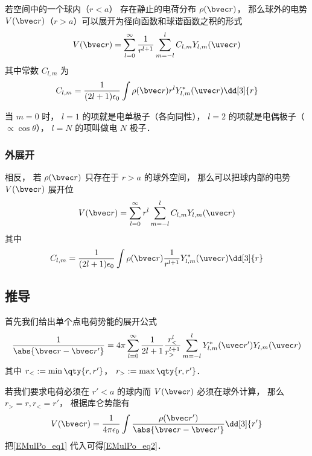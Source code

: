 

若空间中的一个球内（$r < a$） 存在静止的电荷分布 $\rho(\bvec r)$， 那么球外的电势 $V(\bvec r)$（$r > a$）可以展开为径向函数和球谐函数之积的形式
\begin{equation}\label{EMulPo_eq2}
V(\bvec r) = \sum_{l = 0}^\infty \frac{1}{r^{l+1}}\sum_{m = -l}^l C_{l,m} Y_{l,m}(\uvec r)
\end{equation}
其中常数 $C_{l,m}$ 为
\begin{equation}
C_{l,m} = \frac{1}{(2l+1)\epsilon_0} \int \rho(\bvec r) r^l Y_{l,m}^*(\uvec r) \dd[3]{r}
\end{equation}

当 $m = 0$ 时， $l = 1$ 的项就是电单极子（各向同性）， $l = 2$ 的项就是电偶极子（$\propto\cos \theta$）， $l = N$ 的项叫做电 $N$ 极子．

\subsubsection{外展开}
相反， 若 $\rho(\bvec r)$ 只存在于 $r > a$ 的球外空间， 那么可以把球内部的电势 $V(\bvec r)$ 展开位
\begin{equation}
V(\bvec r) = \sum_{l = 0}^\infty r^l \sum_{m = -l}^l C_{l,m} Y_{l,m}(\uvec r)
\end{equation}
其中
\begin{equation}
C_{l,m} = \frac{1}{(2l+1)\epsilon_0} \int \rho(\bvec r) \frac{1}{r^{l+1}} Y_{l,m}^*(\uvec r) \dd[3]{r}
\end{equation}



\subsection{推导}
首先我们给出单个点电荷势能的展开公式
\begin{equation}\label{EMulPo_eq1}
\frac{1}{\abs{\bvec r - \bvec r'}} = 4\pi \sum_{l=0}^{\infty} \frac{1}{2l+1} \frac{r_<^l}{r_>^{l+1}} \sum_{m = -l}^l Y_{l,m}^*(\uvec r') Y_{l,m}(\uvec r)
\end{equation}
其中 $r_< := \min\qty{r, r'}$， $r_> := \max\qty{r, r'}$．

若我们要求电荷必须在 $r' < a$ 的球内而 $V(\bvec r)$ 必须在球外计算， 那么 $r_> = r, r_< = r'$， 根据库仑势能有
\begin{equation}
V(\bvec r) = \frac{1}{4\pi\epsilon_0}\int \frac{\rho(\bvec r')}{\abs{\bvec r - \bvec r'}} \dd[3]{r'}
\end{equation}
把\autoref{EMulPo_eq1} 代入可得\autoref{EMulPo_eq2}．
